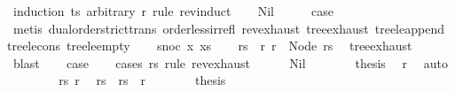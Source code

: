 \begin{isabellebody}
%
\isadelimproof
%
\endisadelimproof
%
\isatagproof
{}\isamarkupfalse%
\ {\isacharparenleft}{\kern0pt}induction\ ts\ arbitrary{\isacharcolon}{\kern0pt}\ r\ rule{\isacharcolon}{\kern0pt}\ rev{\isacharunderscore}{\kern0pt}induct{\isacharparenright}{\kern0pt}\isanewline
\ \ \isamarkupfalse%
\ Nil\isanewline
\ \ \isamarkupfalse%
\ \isamarkupfalse%
\ {\isacharquery}{\kern0pt}case\ \isamarkupfalse%
\ {\isacharparenleft}{\kern0pt}metis\ dual{\isacharunderscore}{\kern0pt}order{\isachardot}{\kern0pt}strict{\isacharunderscore}{\kern0pt}trans{}\ order{\isacharunderscore}{\kern0pt}less{\isacharunderscore}{\kern0pt}irrefl\ rev{\isacharunderscore}{\kern0pt}exhaust\ tree{\isachardot}{\kern0pt}exhaust\ tree{\isacharunderscore}{\kern0pt}le{\isacharunderscore}{\kern0pt}append\ tree{\isacharunderscore}{\kern0pt}le{\isacharunderscore}{\kern0pt}cons{}\ tree{\isacharunderscore}{\kern0pt}le{\isacharunderscore}{\kern0pt}empty{\isacharparenright}{\kern0pt}\isanewline
{}\isamarkupfalse%
\isanewline
\ \ \isamarkupfalse%
\ {\isacharparenleft}{\kern0pt}snoc\ x\ xs{\isacharparenright}{\kern0pt}\isanewline
\ \ \isamarkupfalse%
\ rs\ \ r{\isacharcolon}{\kern0pt}\ {\isachardoublequoteopen}r\ {\isacharequal}{\kern0pt}\ Node\ rs{\isachardoublequoteclose}\ \isamarkupfalse%
\ tree{\isachardot}{\kern0pt}exhaust\ \isamarkupfalse%
\ blast\isanewline
\ \ \isamarkupfalse%
\ {\isacharquery}{\kern0pt}case\isanewline
\ \ \isamarkupfalse%
\ {\isacharparenleft}{\kern0pt}cases\ rs\ rule{\isacharcolon}{\kern0pt}\ rev{\isacharunderscore}{\kern0pt}exhaust{\isacharparenright}{\kern0pt}\isanewline
\ \ \ \ \isamarkupfalse%
\ Nil\isanewline
\ \ \ \ \isamarkupfalse%
\ \isamarkupfalse%
\ {\isacharquery}{\kern0pt}thesis\ \isamarkupfalse%
\ r\ \isamarkupfalse%
\ auto\isanewline
\ \ \isamarkupfalse%
\isanewline
\ \ \ \ \isamarkupfalse%
\ rs{\isacharprime}{\kern0pt}\ r{\isacharprime}{\kern0pt}\ \isamarkupfalse%
\ {\isachardoublequoteopen}rs\ {\isacharequal}{\kern0pt}\ rs{\isacharprime}{\kern0pt}\ {\isacharat}{\kern0pt}\ {\isacharbrackleft}{\kern0pt}r{\isacharprime}{\kern0pt}{\isacharbrackright}{\kern0pt}{\isachardoublequoteclose}\isanewline
\ \ \ \ \isamarkupfalse%
\ \isamarkupfalse%
\ {\isacharquery}{\kern0pt}thesis\ \isamarkupfalse%

\end{isabellebody}

